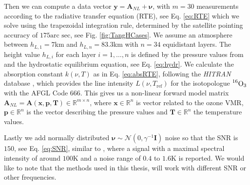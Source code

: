Then we can compute a data vector $\bm{y} = \bm{A}_{NL} + \bm{\nu} $, with $m = 30$ measurements according to the radiative transfer equation (RTE), see Eq. \ref{eq:RTE} which we solve using the trapezoidal integration rule, determined by the satellite pointing accuracy of $175\text{arc sec}$, see Fig. \ref{fig:TangHCases}.
We assume an atmosphere between $h_{L,1}=7$km and $h_{L,n} = 83.3$km with $n = 34$ equidistant layers.
The height value $h_{L,i}$ for each layer $i = 1,\dots, n$ is defined by the pressure values from \cite{MLSdata} and the hydrostatic equilibrium equation, see Eq. \ref{eq:hydr}.
We calculate the absorption constant $k(\nu,T)$ as in Eq. \ref{eq:absRTE}, following the \textit{HITRAN} database \cite{gordon2022hitran2020}, which provides the line intensity $L(\nu,T_{\text{ref}})$ for the isotopologue $\prescript{16}{}{\text{O}}_3$ with the AFGL Code 666.
This gives us a non-linear forward model matrix $\bm{A}_{NL} = \bm{A}(\bm{x}, \bm{p}, \bm{T}) \in \mathbb{R}^{m \times n}$, where $\bm{x}\in \mathbb{R}^{n}$ is vector related to the ozone VMR, $\bm{p}\in \mathbb{R}^{n}$ is the vector describing the pressure values and $\bm{T}\in \mathbb{R}^{n}$ the temperature values.

Lastly we add normally distributed $\bm{\nu} \sim \mathcal{N}(0,\gamma^{-1} \bm{I})$ noise so that the SNR is $150$, see Eq. \ref{eq:SNR}, similar to \cite{Froidevaux2008snrozone}, where a signal with a maximal spectral intensity of around $100\text{K}$ and a noise range of $0.4$ to $1.6\text{K}$ is reported.
We would like to note that the methods used in this thesis, will work with different SNR or other frequencies.

